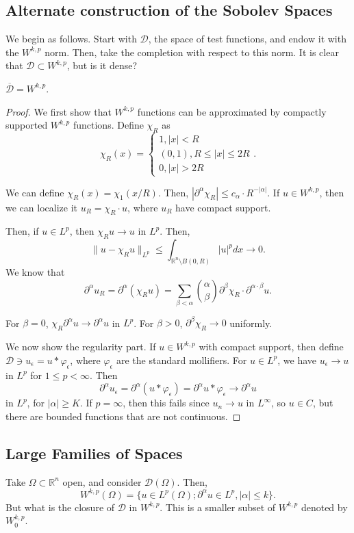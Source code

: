 \documentclass[12pt]{scrartcl}
\newcommand{\R}{\mathbb{R}}
\let \phi \varphi
\let \mc \mathcal
\begin{document}
\subsection{Alternate construction of the Sobolev Spaces}
We begin as follows.  Start with $\mathcal D$, the space of test functions, and endow it with the $W^{k, p}$ norm.  Then, take the completion with respect to this norm.  It is clear that $\mathcal D \subset W^{k, p}$, but is it dense?

\begin{proposition} $\overline{\mc D} = W^{k, p}$.
\end{proposition}
\begin{proof}
We first show that $W^{k, p}$ functions can be approximated by compactly supported $W^{k, p}$ functions.  Define $\chi_R$ as 
$$\chi_R(x) = \begin{cases}
1, |x| < R\\
(0, 1), R \le |x| \le 2R \\
0, |x| > 2R
\end{cases}.$$

We can define $\chi_R(x) = \chi_1(x/R)$.  Then, $|\partial^\alpha \chi_R| \le c_\alpha \cdot R^{-|\alpha|}.$  If $u \in W^{k, p}$, then we can localize it $u_R = \chi_R \cdot u$, where $u_R$ have compact support. 

Then, if $u \in L^p$, then $\chi_R u \to u$ in $L^p$.  Then,
$$\|u - \chi_R u\|_{L^p} \le \int_{\R^n\setminus B(0, R)} |u|^p dx \to 0.$$
We know that $$\partial^\alpha u_R = \partial^\alpha(\chi_R u) = \sum_{\beta < \alpha} \binom{\alpha}{\beta} \partial^\beta \chi_R \cdot \partial^{\alpha \cdot \beta} u.$$

For $\beta = 0$, $\chi_R \partial^\alpha u \to \partial^\alpha u$ in $L^p$.   For $\beta > 0$, $\partial^\beta \chi_R \to 0$ uniformly.

We now show the regularity part.  If $u \in W^{k, p}$ with compact support, then define $\mathcal D \ni u_\epsilon = u * \phi_\epsilon$, where $\phi_\epsilon$ are the standard mollifiers.  For $u \in L^p$, we have $u_\epsilon \to u$ in $L^p$ for $1 \le p < \infty$.  Then
$$\partial^\alpha u_\epsilon = \partial^\alpha(u * \phi_\epsilon) = \partial^\alpha u * \phi_\epsilon \to \partial^\alpha u$$
in $L^p$, for $|\alpha| \ge K$.  If $p = \infty$, then this fails since $u_n \to u$ in $L^\infty$, so $u \in C$, but there are bounded functions that are not continuous.  
\end{proof}
\subsection{Large Families of Spaces} 
Take $\Omega \subset \R^n$ open, and consider $\mc D(\Omega)$.  Then,
$$W^{k, p}(\Omega) = \{u \in L^p(\Omega); \partial^\alpha u \in L^p, |\alpha| \le k\}.$$
But what is the closure of $\mathcal D$ in $W^{k, p}$.  This is a smaller subset of $W^{k, p}$ denoted by $W_0^{k, p}$.
\end{document}
